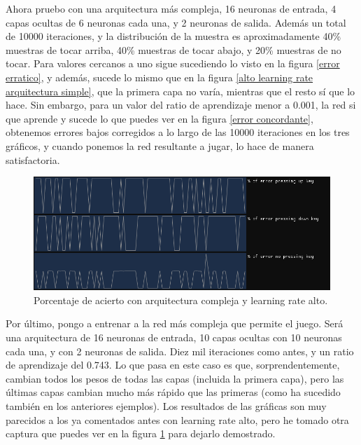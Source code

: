 Ahora pruebo con una arquitectura más compleja, 16 neuronas de entrada, 4 capas ocultas de 6 neuronas cada una, y 2 neuronas de salida. Además un total de 10000 iteraciones, y la distribución de la muestra es aproximadamente 40\% muestras de tocar arriba, 40\% muestras de tocar abajo, y 20\% muestras de no tocar. Para valores cercanos a uno sigue sucediendo lo visto en la figura \ref{error erratico}, y además, sucede lo mismo que en la figura \ref{alto learning rate arquitectura simple}, que la primera capa no varía, mientras que el resto sí que lo hace. Sin embargo, para un valor del ratio de aprendizaje menor a 0.001, la red si que aprende y sucede lo que puedes ver en la figura \ref{error concordante}, obtenemos errores bajos corregidos a lo largo de las 10000 iteraciones en los tres gráficos, y cuando ponemos la red resultante a jugar, lo hace de manera satisfactoria. 

\begin{figure}[H]
	\centering
	\includegraphics[width=15cm]{archivos/imagenes/arquitectura-compleja-learning-rate-alto.png}
	\caption{Porcentaje de acierto con arquitectura compleja y learning rate alto.}
	\label{alto learning rate arquitectura compleja}
\end{figure}

Por último, pongo a entrenar a la red más compleja que permite el juego. Será una arquitectura de 16 neuronas de entrada, 10 capas ocultas con 10 neuronas cada una, y con 2 neuronas de salida.  Diez mil iteraciones como antes, y un ratio de aprendizaje del 0.743. Lo que pasa en este caso es que, sorprendentemente, cambian todos los pesos de todas las capas (incluida la primera capa), pero las últimas capas cambian mucho más rápido que las primeras (como ha sucedido también en los anteriores ejemplos). Los resultados de las gráficas son muy parecidos a los ya comentados antes con learning rate alto, pero he tomado otra captura que puedes ver en la figura \ref{alto learning rate arquitectura compleja} para dejarlo demostrado.

